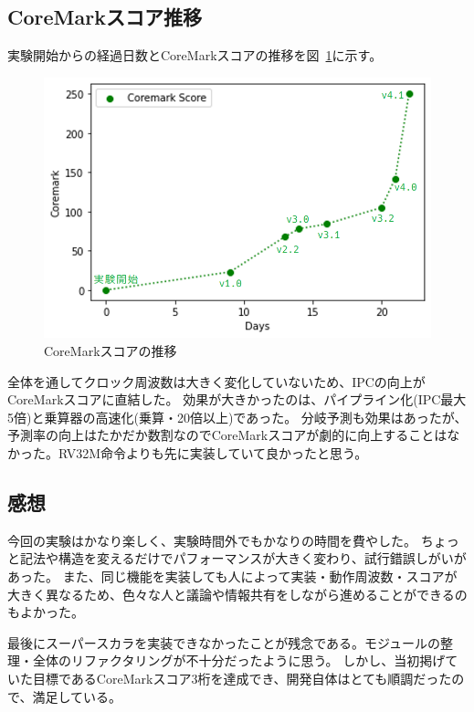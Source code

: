\documentclass[dvipdfmx,10pt,a4paper,titlepage]{jsarticle}
\begin{document}
    \subsection{CoreMarkスコア推移}
    実験開始からの経過日数とCoreMarkスコアの推移を図~\ref{fig:score}に示す。
    \begin{figure}[h]
        \centering
        \includegraphics[width=12cm]{figure/coremark_plot.png}
        \caption{CoreMarkスコアの推移}\label{fig:score}
    \end{figure}
    全体を通してクロック周波数は大きく変化していないため、IPCの向上がCoreMarkスコアに直結した。
    効果が大きかったのは、パイプライン化(IPC最大5倍)と乗算器の高速化(乗算・20倍以上)であった。
    分岐予測も効果はあったが、予測率の向上はたかだか数割なのでCoreMarkスコアが劇的に向上することはなかった。RV32M命令よりも先に実装していて良かったと思う。
    \subsection{感想}
    今回の実験はかなり楽しく、実験時間外でもかなりの時間を費やした。
    ちょっと記法や構造を変えるだけでパフォーマンスが大きく変わり、試行錯誤しがいがあった。
    また、同じ機能を実装しても人によって実装・動作周波数・スコアが大きく異なるため、色々な人と議論や情報共有をしながら進めることができるのもよかった。

    最後にスーパースカラを実装できなかったことが残念である。モジュールの整理・全体のリファクタリングが不十分だったように思う。
    しかし、当初掲げていた目標であるCoreMarkスコア3桁を達成でき、開発自体はとても順調だったので、満足している。
\end{document}
